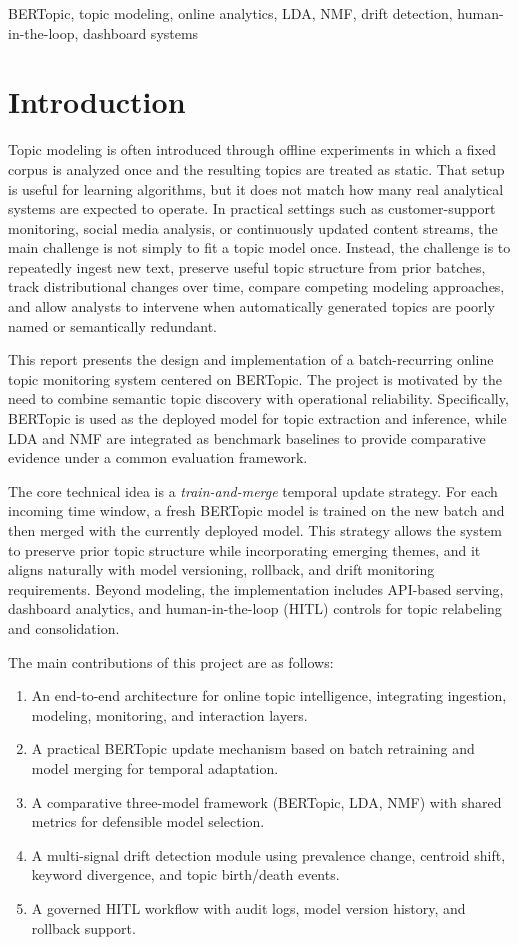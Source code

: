 \documentclass[conference]{IEEEtran}
\newcommand{\bertopic}{BERTopic\xspace}
\newcommand{\lda}{LDA\xspace}
\newcommand{\nmf}{NMF\xspace}
\newcommand{\hitl}{HITL\xspace}
\begin{document}
\begin{IEEEkeywords}
BERTopic, topic modeling, online analytics, LDA, NMF, drift detection, human-in-the-loop, dashboard systems
\end{IEEEkeywords}

\section{Introduction}
Topic modeling is often introduced through offline experiments in which a fixed corpus is analyzed once and the resulting topics are treated as static. That setup is useful for learning algorithms, but it does not match how many real analytical systems are expected to operate. In practical settings such as customer-support monitoring, social media analysis, or continuously updated content streams, the main challenge is not simply to fit a topic model once. Instead, the challenge is to repeatedly ingest new text, preserve useful topic structure from prior batches, track distributional changes over time, compare competing modeling approaches, and allow analysts to intervene when automatically generated topics are poorly named or semantically redundant.

This report presents the design and implementation of a batch-recurring online topic monitoring system centered on \bertopic. The project is motivated by the need to combine semantic topic discovery with operational reliability. Specifically, \bertopic is used as the deployed model for topic extraction and inference, while \lda and \nmf are integrated as benchmark baselines to provide comparative evidence under a common evaluation framework.

The core technical idea is a \emph{train-and-merge} temporal update strategy. For each incoming time window, a fresh \bertopic model is trained on the new batch and then merged with the currently deployed model. This strategy allows the system to preserve prior topic structure while incorporating emerging themes, and it aligns naturally with model versioning, rollback, and drift monitoring requirements. Beyond modeling, the implementation includes API-based serving, dashboard analytics, and human-in-the-loop (\hitl) controls for topic relabeling and consolidation.

The main contributions of this project are as follows:
\begin{enumerate}[leftmargin=*]
    \item An end-to-end architecture for online topic intelligence, integrating ingestion, modeling, monitoring, and interaction layers.
    \item A practical \bertopic update mechanism based on batch retraining and model merging for temporal adaptation.
    \item A comparative three-model framework (\bertopic, \lda, \nmf) with shared metrics for defensible model selection.
    \item A multi-signal drift detection module using prevalence change, centroid shift, keyword divergence, and topic birth/death events.
    \item A governed \hitl workflow with audit logs, model version history, and rollback support.
\end{enumerate}
\end{document}
